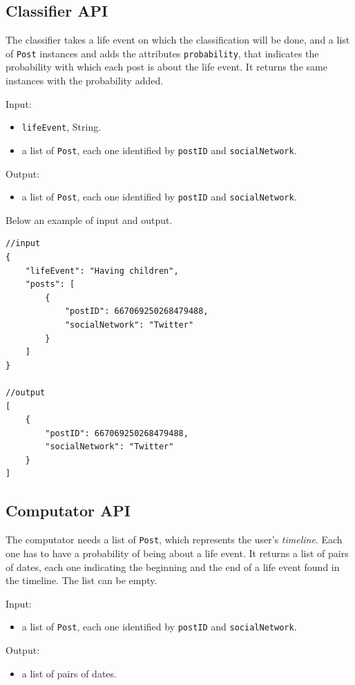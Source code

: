 \subsection{Classifier API}
The classifier takes a life event on which the classification will be done, and a list of \texttt{Post} instances and adds the attributes \texttt{probability}, that indicates the probability with which each post is about the life event. It returns the same instances with the probability added.

Input:
\begin{itemize}
\item \texttt{lifeEvent}, String.
\item a list of \texttt{Post}, each one identified by \texttt{postID} and \texttt{socialNetwork}.
\end{itemize}

Output:
\begin{itemize}
\item a list of \texttt{Post}, each one identified by \texttt{postID} and \texttt{socialNetwork}.
\end{itemize}

Below an example of input and output.

\begin{Verbatim}
//input
{
	"lifeEvent": "Having children",
	"posts": [
		{
			"postID": 667069250268479488,
			"socialNetwork": "Twitter"
		}
	]
}

//output
[
	{
		"postID": 667069250268479488,
		"socialNetwork": "Twitter"
	}
]
\end{Verbatim}

\subsection{Computator API}
The computator needs a list of \texttt{Post}, which represents the user's \emph{timeline}. Each one has to have a probability of being about a life event. It returns a list of pairs of dates, each one indicating the beginning and the end of a life event found in the timeline. The list can be empty.

Input:
\begin{itemize}
\item a list of \texttt{Post}, each one identified by \texttt{postID} and \texttt{socialNetwork}.
\end{itemize}

Output:
\begin{itemize}
\item a list of pairs of dates.
\end{itemize}

